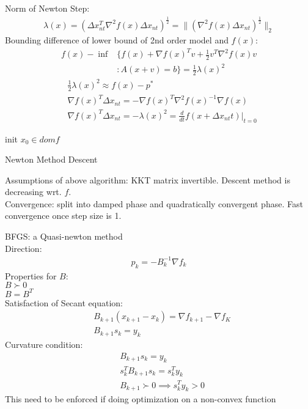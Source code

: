\documentclass[8pt]{extarticle}
\newcommand{\norm}[1]{\|#1\|}
\begin{document}
\begin{multicols*}{2}
  Norm of Newton Step:
  \begin{align*}
    \lambda(x) = (\Delta x_{nt}^T \nabla^2 f(x) \Delta x_{nt})^{\frac{1}{2}} = \norm{(\nabla^2 f(x) \Delta x_{nt})^{\frac{1}{2}}}_2
  \end{align*}
  Bounding difference of lower bound of 2nd order model and $f(x)$:
  \begin{align*}
    f(x) - \inf & \{ f(x) + \nabla f(x)^T v + \frac{1}{2} v^T \nabla^2 f(x) v\\
                &: A(x+v) = b \} = \frac{1}{2} \lambda(x)^2
  \end{align*}
  \begin{align*}
    &\frac{1}{2}\lambda(x)^2 \approx f(x) -p^*\\
    &\nabla f(x)^T \Delta x_{nt} = - \nabla f(x)^T \nabla^2 f(x)^{-1} \nabla f(x)\\
    &\nabla f(x)^T \Delta x_{nt} = -\lambda(x)^2 = \frac{d}{dt}f(x+\Delta x_{nt}t)|_{t=0}
  \end{align*}
  
  \begin{algorithm}[H]
    init $x_0 \in dom f$\;
    \caption{Newton Method Descent\label{NewtonMethod}}
  \end{algorithm}
  Assumptions of above algorithm: KKT matrix invertible. Descent method is decreasing wrt. $f$.\\
  
  Convergence: split into damped phase and quadratically convergent phase. Fast convergence once step size is 1.

  \vfill\null
  \columnbreak

  BFGS: a Quasi-newton method\\
  Direction:
  \begin{align*}
    p_k = -B_k^{-1} \nabla f_k
  \end{align*}
  Properties for $B$:\\
  $B \succ 0$\\
  $B=B^T$\\
  Satisfaction of Secant equation:
  \begin{align*}
    &B_{k+1} (x_{k+1}-x_k) = \nabla f_{k+1} - \nabla f_K\\
    &B_{k+1} s_k = y_k
  \end{align*}
  Curvature condition:
  \begin{align*}
    &B_{k+1} s_k = y_k\\
    &s_k^T B_{k+1} s_k = s_k^T y_k\\
    &B_{k+1} \succ 0 \implies s_k^T y_k > 0
  \end{align*}
  This need to be enforced if doing optimization on a non-convex function\\


\end{multicols*}
\end{document}
